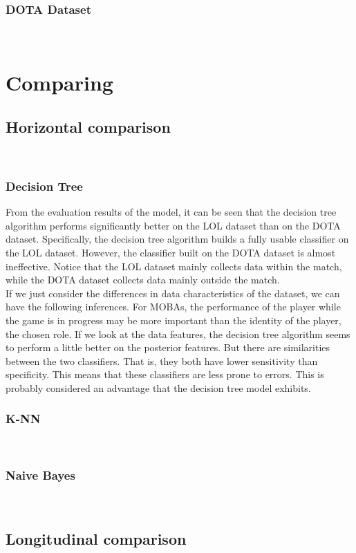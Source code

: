 \documentclass[a4paper,fleqn]{cas-sc}
\begin{document}
\subsubsection{DOTA Dataset}
 \\

\section{Comparing}
\subsection{Horizontal comparison}
\\
\subsubsection{Decision Tree}
From the evaluation results of the model, it can be seen that the decision tree algorithm performs significantly better on the LOL dataset than on the DOTA dataset. Specifically, the decision tree algorithm builds a fully usable classifier on the LOL dataset. However, the classifier built on the DOTA dataset is almost ineffective. Notice that the LOL dataset mainly collects data within the match, while the DOTA dataset collects data mainly outside the match.\\
If we just consider the differences in data characteristics of the dataset, we can have the following inferences. For MOBAs, the performance of the player while the game is in progress may be more important than the identity of the player, the chosen role. If we look at the data features, the decision tree algorithm seems to perform a little better on the posterior features. But there are similarities between the two classifiers. That is, they both have lower sensitivity than specificity. This means that these classifiers are less prone to errors. This is probably considered an advantage that the decision tree model exhibits.
\\
\subsubsection{K-NN}
\\
\subsubsection{Naive Bayes}
\\
\subsection{ Longitudinal comparison}
\\
\end{document}
